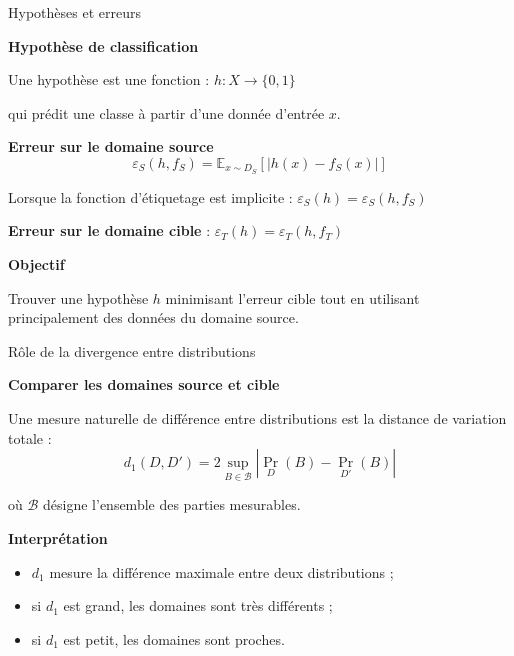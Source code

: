 \documentclass[11pt]{beamer}
\begin{document}
\begin{frame}{Hypothèses et erreurs}

\textbf{Hypothèse de classification}

\vspace{0.2cm}

Une hypothèse est une fonction : $
h : X \rightarrow \{0,1\}$

qui prédit une classe à partir d’une donnée d’entrée $x$.

\vspace{0.3cm}

\textbf{Erreur sur le domaine source}
\[
\varepsilon_S(h,f_S)
=
\mathbb{E}_{x \sim D_S}
\left[
|h(x)-f_S(x)|
\right]
\]

Lorsque la fonction d’étiquetage est implicite :  $
\varepsilon_S(h)
=
\varepsilon_S(h,f_S)$

\vspace{0.3cm}

\textbf{Erreur sur le domaine cible} :  $
\varepsilon_T(h)
=
\varepsilon_T(h,f_T)$

\vspace{0.4cm}

\textbf{Objectif}

Trouver une hypothèse $h$ minimisant l’erreur cible tout en utilisant principalement des données du domaine source.

\end{frame}



\begin{frame}{Rôle de la divergence entre distributions}

\textbf{Comparer les domaines source et cible}

\vspace{0.3cm}

Une mesure naturelle de différence entre distributions est la
distance de variation totale :
\[
d_1(D,D')
=
2
\sup_{B \in \mathcal{B}}
\left|
\Pr_D(B)-\Pr_{D'}(B)
\right|
\]

\vspace{0.2cm}

où $\mathcal{B}$ désigne l’ensemble des parties mesurables.


\vspace{0.2cm}

\textbf{Interprétation}

\begin{itemize}
    \item $d_1$ mesure la différence maximale entre deux distributions ;
    
    \item si $d_1$ est grand, les domaines sont très différents ;
    \item si $d_1$ est petit, les domaines sont proches.
\end{itemize}

\end{frame}
\end{document}
